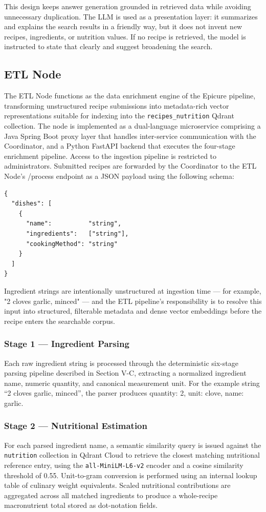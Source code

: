 \documentclass[conference]{IEEEtran}
\begin{document}
This design keeps answer generation grounded in retrieved data while avoiding unnecessary duplication. The LLM is used as a presentation layer: it summarizes and explains the search results in a friendly way, but it does not invent new recipes, ingredients, or nutrition values. If no recipe is retrieved, the model is instructed to state that clearly and suggest broadening the search.


\subsection{ETL Node}
\label{sec:etlnode}
The ETL Node functions as the data enrichment engine of the Epicure pipeline, transforming unstructured recipe submissions into metadata-rich vector representations suitable for indexing into the \texttt{recipes\_nutrition} Qdrant collection. The node is implemented as a dual-language microservice comprising a Java Spring Boot proxy layer that handles inter-service communication with the Coordinator, and a Python FastAPI backend that executes the four-stage enrichment pipeline.
Access to the ingestion pipeline is restricted to administrators. Submitted recipes are forwarded by the Coordinator to the ETL Node's /process endpoint as a JSON payload using the following schema:

\begin{lstlisting}[language={},basicstyle=\ttfamily]
{
  "dishes": [
    {
      "name":          "string",
      "ingredients":   ["string"],
      "cookingMethod": "string"
    }
  ]
}
\end{lstlisting}

Ingredient strings are intentionally unstructured at ingestion time — for example, "2 cloves garlic, minced" — and the ETL pipeline's responsibility is to resolve this input into structured, filterable metadata and dense vector embeddings before the recipe enters the searchable corpus.

\subsubsection{Stage 1 — Ingredient Parsing}
Each raw ingredient string is processed through the deterministic six-stage parsing pipeline described in Section V-C, extracting a normalized ingredient name, numeric quantity, and canonical measurement unit. For the example string ``2 cloves garlic, minced'', the parser produces quantity: 2, unit: clove, name: garlic.

\subsubsection{Stage 2 — Nutritional Estimation}
For each parsed ingredient name, a semantic similarity query is issued against the \texttt{nutrition} collection in Qdrant Cloud to retrieve the closest matching nutritional reference entry, using the \texttt{all-MiniLM-L6-v2} encoder and a cosine similarity threshold of 0.55. Unit-to-gram conversion is performed using an internal lookup table of culinary weight equivalents. Scaled nutritional contributions are aggregated across all matched ingredients to produce a whole-recipe macronutrient total stored as dot-notation fields.
\end{document}
